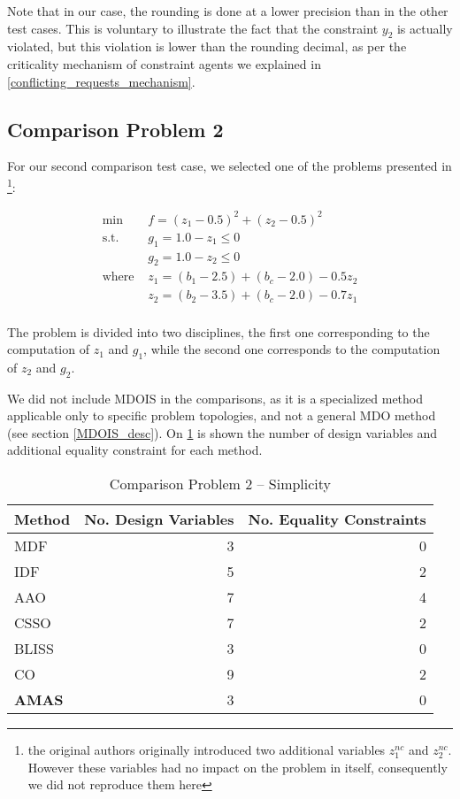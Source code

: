 Note that in our case, the rounding is done at a lower precision than in the other test cases. This is voluntary to illustrate the fact that the constraint $y_2$ is actually violated, but this violation is lower than the rounding decimal, as per the criticality mechanism of constraint agents we explained in \ref{conflicting_requests_mechanism}.

\subsection{Comparison Problem 2}

For our second comparison test case, we selected one of the problems presented in  \cite{Yi2008}\footnote{the original authors originally introduced two additional variables $z_1^{nc}$ and $z_2^{nc}$. However these variables had no impact on the problem in itself, consequently we did not reproduce them here}:

\begin{align*}
\text{min }		&	f =(z_1 - 0.5)^2  + (z_2 - 0.5)^2\\
\text{s.t. }			&	g_1 = 1.0 -  z_1 \leq 0\\ 
							&	g_2 = 1.0 -  z_2 \leq 0\\ 
\text{where }	& z_1 = (b_1 - 2.5) + (b_c -2.0) -0.5z_2\\
							& z_2 = (b_2 - 3.5) + (b_c -2.0) -0.7z_1\\
\end{align*}

The problem is divided into two disciplines, the first one corresponding to the computation of $z_1$ and $g_1$, while the second one corresponds to the computation of $z_2$ and $g_2$.

We did not include MDOIS in the comparisons, as it is a specialized method applicable only to specific problem topologies, and not a general MDO method (see section \ref{MDOIS_desc}). On \tablename{} \ref{bench2_simplicity} is shown the number of design variables and additional equality constraint for each method.

\begin{table}
\caption{Comparison Problem 2 -- Simplicity}\label{bench2_simplicity}
\centering
\begin{tabular}{lrr}
\toprule
Method & No. Design Variables & No. Equality Constraints\\
\midrule
MDF					&	3	&	0 \\
IDF						&	5	&	2 \\
AAO					& 7	&	4 \\
CSSO					&	7	&	2 \\
BLISS					&	3	&	0	\\
CO						&	9	&	2	\\
\textbf{AMAS}&	3	&	0	\\
\bottomrule
\end{tabular}
\end{table}


